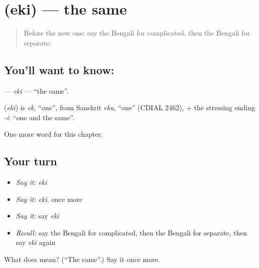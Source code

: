 \section[\texorpdfstring{\bn{একই} (eki)}{একই (eki)}]{ (eki) — the same}

\label{lesson:BN-C192-eki}



\begin{quote}
Before the new one: say the Bengali for complicated, then the Bengali for separate.
\end{quote}

\subsection*{You'll want to know: }
\textbf{} — \emph{eki} — \textquotedblleft{}the same\textquotedblright{}.

\begin{cousinweb}
\textbf{} (\emph{eki}) is \emph{ek}, \textquotedblleft{}one\textquotedblright{}, from Sanskrit \emph{eka}, \textquotedblleft{}one\textquotedblright{} (CDIAL 2462), + the stressing ending \emph{-i}: \textquotedblleft{}one and the same\textquotedblright{}.
\end{cousinweb}

\begin{grammarlens}[title={What you've built}]
One more word for this chapter.
\end{grammarlens}

\subsection*{Your turn}
\begin{itemize}
\raggedright
  \item \emph{Say it:} \emph{eki}
  \item \emph{Say it:} \emph{eki}, once more
  \item \emph{Say it:} say \emph{eki}
  \item \emph{Recall:} say the Bengali for complicated, then the Bengali for separate, then say \emph{eki} again
\end{itemize}

\begin{tcolorbox}[breakable,colback=teal!4,colframe=teal!35!black,title={Before you move on}]
What does  mean? (\textquotedblleft{}The same\textquotedblright{}.) Say it once more.
\end{tcolorbox}
